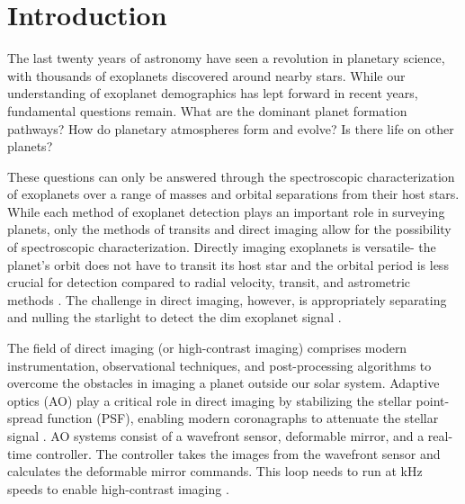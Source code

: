 \section{Introduction}\label{sec:intro}

The last twenty years of astronomy have seen a revolution in planetary science, with thousands of exoplanets discovered around nearby stars. While our understanding of exoplanet demographics has lept forward in recent years, fundamental questions remain. What are the dominant planet formation pathways? How do planetary atmospheres form and evolve? Is there life on other planets?

These questions can only be answered through the spectroscopic characterization of exoplanets over a range of masses and orbital separations from their host stars. While each method of exoplanet detection plays an important role in surveying planets, only the methods of transits and direct imaging allow for the possibility of spectroscopic characterization. Directly imaging exoplanets is versatile- the planet's orbit does not have to transit its host star and the orbital period is less crucial for detection compared to radial velocity, transit, and astrometric methods \citep{2013pss3.book..489W}. The challenge in direct imaging, however, is appropriately separating and nulling the starlight to detect the dim exoplanet signal \citep{2010exop.book..111T}.

The field of direct imaging (or high-contrast imaging) comprises modern instrumentation, observational techniques, and post-processing algorithms to overcome the obstacles in imaging a planet outside our solar system. Adaptive optics (AO) play a critical role in direct imaging by stabilizing the stellar point-spread function (PSF), enabling modern coronagraphs to attenuate the stellar signal \citep{2005ApJ...629..592G}. AO systems consist of a wavefront sensor, deformable mirror, and a real-time controller. The controller takes the images from the wavefront sensor and calculates the deformable mirror commands. This loop needs to run at kHz speeds to enable high-contrast imaging \citep{2018ARA&A..56..315G}.


